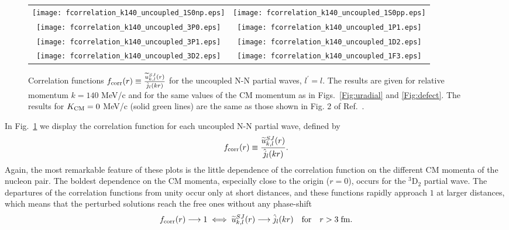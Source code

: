 \documentclass[aps,twocolumn,showpacs,preprintnumbers,amsmath,amssymb,nofootinbib,superscriptaddress,showkeys,noeprint]{revtex4-1}
\begin{document}
\begin{figure*}[!ht]
\begin{tabular}{cc}
\texttt{[image: fcorrelation\_k140\_uncoupled\_1S0np.eps]}&
\texttt{[image: fcorrelation\_k140\_uncoupled\_1S0pp.eps]}\\
\texttt{[image: fcorrelation\_k140\_uncoupled\_3P0.eps]}&
\texttt{[image: fcorrelation\_k140\_uncoupled\_1P1.eps]}\\
\texttt{[image: fcorrelation\_k140\_uncoupled\_3P1.eps]}&
\texttt{[image: fcorrelation\_k140\_uncoupled\_1D2.eps]}\\
\texttt{[image: fcorrelation\_k140\_uncoupled\_3D2.eps]}&
\texttt{[image: fcorrelation\_k140\_uncoupled\_1F3.eps]}
\end{tabular}
\caption{Correlation functions $f_{\rm corr}(r)\equiv
  \frac{\widetilde{u}^{SJ}_{k,l}(r)}{\hat{j}_l(kr)}$ for the uncoupled
  N-N partial waves, $l^\prime=l$.  The results are given for relative
  momentum $k=140$ MeV/c and for the same values of the CM momentum as
  in Figs.~\ref{Fig:uradial} and \ref{Fig:defect}.  The results for
  $K_{\rm CM}=0$ MeV/c (solid green lines) are the same as those shown
  in Fig. 2 of Ref.~\cite{RuizSimo:2017tcb}.}
\label{Fig:fcorrelation}
\end{figure*}

In Fig.~\ref{Fig:fcorrelation} we display the correlation function for
each uncoupled N-N partial wave, defined by
\begin{equation}\label{eq:fcorrelation}
f_{\rm corr}(r)\equiv 
\frac{\widetilde{u}^{SJ}_{k,l}(r)}{\hat{j}_l(kr)}.
\end{equation}
Again, the most remarkable feature of these plots is the little
dependence of the correlation function on the different CM momenta of
the nucleon pair. The boldest dependence on the CM momenta, especially
close to the origin ($r=0$), occurs for the ${}^{3}$D$_2$ partial
wave. The departures of the correlation functions from unity occur
only at short distances, and these functions rapidly approach $1$ at
larger distances, which means that the perturbed solutions reach the
free ones without any phase-shift
\begin{equation}\label{limit_fcorr}
f_{\rm corr}(r) \longrightarrow 1\; \Longleftrightarrow \;
\widetilde{u}^{SJ}_{k,l}(r) \longrightarrow \hat{j}_l(kr)
\quad {\rm for} \quad r > 3 \; {\rm fm}.
\end{equation} 
\end{document}
